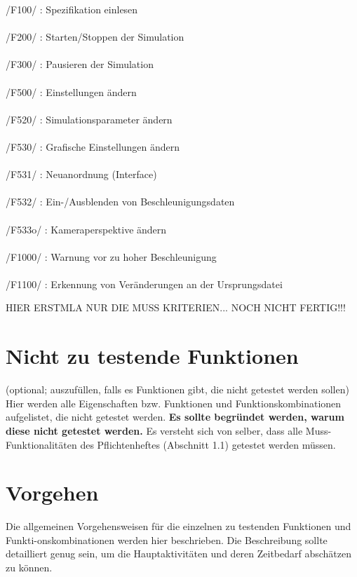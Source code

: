 /F100/ : Spezifikation einlesen\\
\\
/F200/ : Starten/Stoppen der Simulation\\
\\
/F300/ : Pausieren der Simulation\\
\\
/F500/ : Einstellungen ändern\\
\\
/F520/ : Simulationsparameter ändern\\
\\
/F530/ : Grafische Einstellungen ändern\\
\\
/F531/ : Neuanordnung (Interface)\\
\\
/F532/ : Ein-/Ausblenden von Beschleunigungsdaten\\
\\
/F533o/ : Kameraperspektive ändern\\
\\
/F1000/ : Warnung vor zu hoher Beschleunigung\\
\\
/F1100/ : Erkennung von Veränderungen an der Ursprungsdatei



HIER ERSTMLA NUR DIE MUSS KRITERIEN... NOCH NICHT FERTIG!!!

\section{Nicht zu testende Funktionen}
(optional; auszufüllen, falls es Funktionen gibt, die nicht getestet werden
sollen)\\

Hier werden alle Eigenschaften bzw. Funktionen und Funktionskombinationen
aufgelistet, die nicht getestet werden.
\textbf{ Es sollte begründet werden, warum diese nicht getestet werden.} Es
versteht sich von selber, dass alle Muss-Funktionalitäten des Pflichtenheftes
(Abschnitt 1.1) getestet werden müssen.

\section{Vorgehen}
Die allgemeinen Vorgehensweisen für die einzelnen zu testenden Funktionen und
Funkti-onskombinationen werden hier beschrieben. Die Beschreibung sollte
detailliert genug sein, um die Hauptaktivitäten und deren Zeitbedarf abschätzen
zu können.

